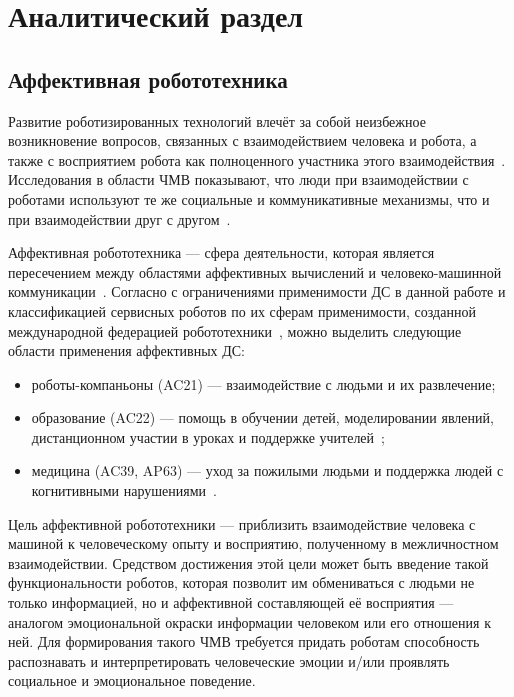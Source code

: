 \chapter{Аналитический раздел}

\section{Аффективная робототехника}

Развитие роботизированных технологий влечёт за собой неизбежное возникновение вопросов, связанных с взаимодействием человека и робота, а также с восприятием робота как полноценного участника этого взаимодействия~\cite{akmaev2025dynamics}.
Исследования в области ЧМВ показывают, что люди при взаимодействии с роботами используют те же социальные и коммуникативные механизмы, что и при взаимодействии друг с другом~\cite{park2012lawofattraction}.

Аффективная робототехника --- сфера деятельности, которая является пересечением между областями аффективных вычислений и человеко-машинной коммуникации~\cite{spitale2022affective}. %
Согласно с ограничениями применимости ДС в данной работе и классификацией сервисных роботов по их сферам применимости, созданной международной федерацией робототехники~\cite{international_federation_of_robotics}, можно выделить следующие области применения аффективных ДС:

\begin{itemize}
	\item роботы-компаньоны (AC21) --- взаимодействие с людьми и их развлечение;
	\item образование (AC22) --- помощь в обучении детей, моделировании явлений, дистанционном участии в уроках и поддержке учителей~\cite{affect-rob-in-edu};
	\item медицина (AC39, AP63) --- уход за пожилыми людьми и поддержка людей с когнитивными нарушениями~\cite{affect-rob-in-med, affect-rob-in-med-2}.
\end{itemize}

Цель аффективной робототехники --- приблизить взаимодействие человека с машиной к человеческому опыту и восприятию, полученному в межличностном взаимодействии. %
Средством достижения этой цели может быть введение такой функциональности роботов, которая позволит им обмениваться с людьми не только информацией, но и аффективной составляющей её восприятия --- аналогом эмоциональной окраски информации человеком или его отношения к ней.
Для формирования такого ЧМВ требуется придать роботам способность распознавать и интерпретировать человеческие эмоции и/или проявлять социальное и эмоциональное поведение.

